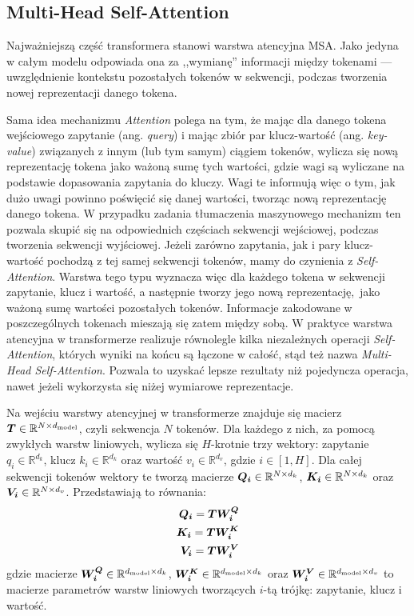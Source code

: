 \subsection{Multi-Head Self-Attention}

Najważniejszą część transformera stanowi warstwa atencyjna MSA. Jako jedyna w całym modelu odpowiada ona za ,,wymianę'' informacji między tokenami --- uwzględnienie kontekstu pozostałych tokenów w sekwencji, podczas tworzenia nowej reprezentacji danego tokena.

Sama idea mechanizmu \emph{Attention} polega na tym, że mając dla danego tokena wejściowego zapytanie (ang. \emph{query}) i mając zbiór par klucz-wartość (ang. \emph{key-value}) związanych z innym (lub tym samym) ciągiem tokenów, wylicza się nową reprezentację tokena jako ważoną sumę tych wartości, gdzie wagi są wyliczane na podstawie dopasowania zapytania do kluczy. Wagi te informują więc o tym, jak dużo uwagi powinno poświęcić się danej wartości, tworząc nową reprezentację danego tokena. W przypadku zadania tłumaczenia maszynowego mechanizm ten pozwala skupić się na odpowiednich częściach sekwencji wejściowej, podczas tworzenia sekwencji wyjściowej. Jeżeli zarówno zapytania, jak i pary klucz-wartość pochodzą z tej samej sekwencji tokenów, mamy do czynienia z \emph{Self-Attention}. Warstwa tego typu wyznacza więc dla każdego tokena w sekwencji zapytanie, klucz i wartość, a następnie tworzy jego nową reprezentację, jako ważoną sumę wartości pozostałych tokenów. Informacje zakodowane w poszczególnych tokenach mieszają się zatem między sobą. W praktyce warstwa atencyjna w transformerze realizuje równolegle kilka niezależnych operacji \emph{Self-Attention}, których wyniki na końcu są łączone w całość, stąd też nazwa \emph{Multi-Head Self-Attention}. Pozwala to uzyskać lepsze rezultaty niż pojedyncza operacja, nawet jeżeli wykorzysta się niżej wymiarowe reprezentacje.

Na wejściu warstwy atencyjnej w transformerze znajduje się macierz $\boldsymbol{T} \in \mathbb{R}^{N \times d_{\mathrm{model}}}$, czyli sekwencja $N$ tokenów. Dla każdego z nich, za pomocą zwykłych warstw liniowych, wylicza się $H$-krotnie trzy wektory: zapytanie $q_i \in \mathbb{R}^{d_k}$, klucz $k_i \in \mathbb{R}^{d_k}$ oraz wartość $v_i \in \mathbb{R}^{d_v}$, gdzie $i \in [1, H]$. Dla całej sekwencji tokenów wektory te tworzą macierze $\boldsymbol{Q_i} \in \mathbb{R}^{N \times d_k}$, $\boldsymbol{K_i} \in \mathbb{R}^{N \times d_k}$ oraz $\boldsymbol{V_i} \in \mathbb{R}^{N \times d_v}$. Przedstawiają to równania:
\begin{eqnarray}
    \boldsymbol{Q_i} = \boldsymbol{T} \boldsymbol{W_i^Q} \\
    \boldsymbol{K_i} = \boldsymbol{T} \boldsymbol{W_i^K} \\
    \boldsymbol{V_i} = \boldsymbol{T} \boldsymbol{W_i^V}
\end{eqnarray}
gdzie macierze $\boldsymbol{W_i^Q} \in \mathbb{R}^{d_{\mathrm{model}} \times d_k}$, $\boldsymbol{W_i^K} \in \mathbb{R}^{d_{\mathrm{model}} \times d_k}$ oraz $\boldsymbol{W_i^V} \in \mathbb{R}^{d_{\mathrm{model}} \times d_v}$ to macierze parametrów warstw liniowych tworzących $i$-tą trójkę: zapytanie, klucz i wartość.

